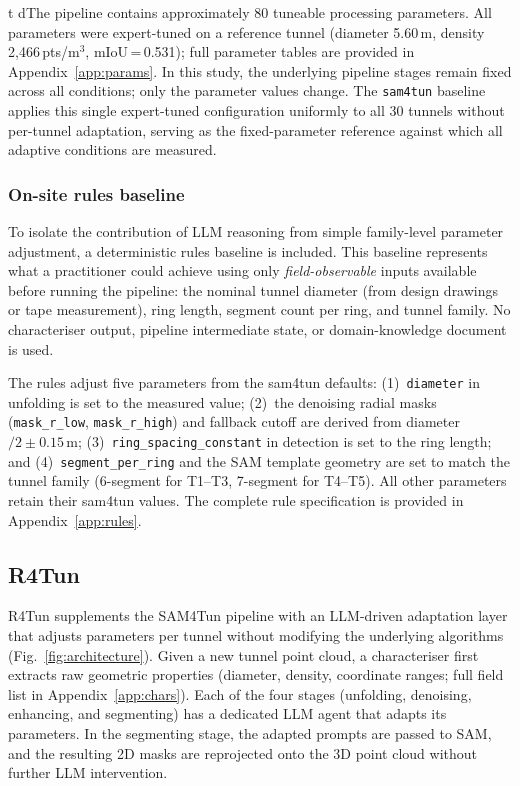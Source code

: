 \documentclass[a4paper,fleqn]{cas-dc}
\begin{document}
t dThe pipeline contains approximately 80 tuneable processing parameters. All parameters were expert-tuned on a reference tunnel (diameter 5.60\,m, density 2{,}466\,pts/m$^3$, mIoU\,=\,0.531); full parameter tables are provided in Appendix~\ref{app:params}. In this study, the underlying pipeline stages remain fixed across all conditions; only the parameter values change. The \texttt{sam4tun} baseline applies this single expert-tuned configuration uniformly to all 30 tunnels without per-tunnel adaptation, serving as the fixed-parameter reference against which all adaptive conditions are measured.

\subsubsection{On-site rules baseline}\label{sec:rules-baseline}

To isolate the contribution of LLM reasoning from simple family-level parameter adjustment, a deterministic rules baseline is included. This baseline represents what a practitioner could achieve using only \emph{field-observable} inputs available before running the pipeline: the nominal tunnel diameter (from design drawings or tape measurement), ring length, segment count per ring, and tunnel family. No characteriser output, pipeline intermediate state, or domain-knowledge document is used.

The rules adjust five parameters from the sam4tun defaults: (1)~\texttt{diameter} in unfolding is set to the measured value; (2)~the denoising radial masks (\texttt{mask\_r\_low}, \texttt{mask\_r\_high}) and fallback cutoff are derived from diameter$/2 \pm 0.15$\,m; (3)~\texttt{ring\_spacing\_constant} in detection is set to the ring length; and (4)~\texttt{segment\_per\_ring} and the SAM template geometry are set to match the tunnel family (6-segment for T1--T3, 7-segment for T4--T5). All other parameters retain their sam4tun values. The complete rule specification is provided in Appendix~\ref{app:rules}.

\subsection{R4Tun}\label{sec:method}

R4Tun supplements the SAM4Tun pipeline with an LLM-driven adaptation layer that adjusts parameters per tunnel without modifying the underlying algorithms (Fig.~\ref{fig:architecture}). Given a new tunnel point cloud, a characteriser first extracts raw geometric properties (diameter, density, coordinate ranges; full field list in Appendix~\ref{app:chars}). Each of the four stages (unfolding, denoising, enhancing, and segmenting) has a dedicated LLM agent that adapts its parameters. In the segmenting stage, the adapted prompts are passed to SAM, and the resulting 2D masks are reprojected onto the 3D point cloud without further LLM intervention.
\end{document}
